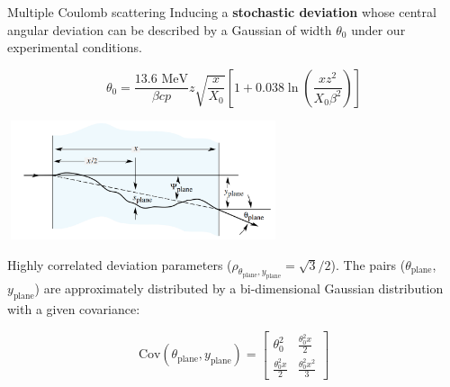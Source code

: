 \documentclass[8 pt]{beamer}
\begin{document}
\begin{frame}{Multiple Coulomb scattering}
\justifying
Inducing a \alert{\textbf{stochastic deviation}} whose central angular deviation can be described by a Gaussian of width $\theta_0$ under our experimental conditions.

\begin{equation*}
\label{eq:Moliere}
\theta_0 = \frac{13.6 \text{ MeV}}{\beta c p} z \sqrt{\frac{x}{X_0}} \left [1 + 0.038 \ln \left (\frac{x z^2}{X_0 \beta^2} \right ) \right ]
\end{equation*}

\begin{center}
\includegraphics[width=8cm, height=3.5cm]{figs/moliere.png}
\end{center} \vfill

Highly correlated deviation parameters ($\rho_{\theta_\text{plane}, y_\text{plane}}=\sqrt{3}/2$). The pairs ($\theta_\text{plane}$, $y_\text{plane}$) are approximately distributed by a bi-dimensional Gaussian distribution with a given covariance:

\begin{equation}
\text{Cov}(\theta_\text{plane}, y_\text{plane}) = \begin{bmatrix}
\theta^2_0 & \frac{\theta_0^2x}{2} \\
\frac{\theta_0^2x}{2} & \frac{\theta_0^2x^2}{3} 
\end{bmatrix}
\end{equation} \vfill
\end{frame}
\end{document}
